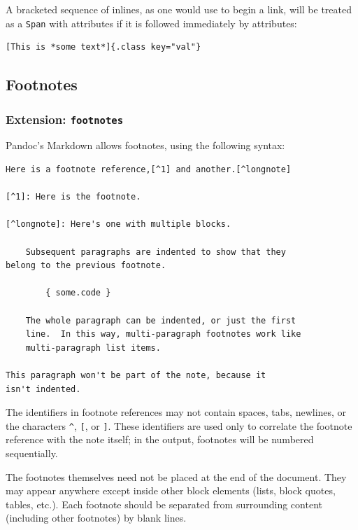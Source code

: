 \documentclass[
]{article}
\begin{document}
A bracketed sequence of inlines, as one would use to begin a link, will
be treated as a \texttt{Span} with attributes if it is followed
immediately by attributes:

\begin{verbatim}
[This is *some text*]{.class key="val"}
\end{verbatim}

\hypertarget{footnotes}{%
\subsection{Footnotes}\label{footnotes}}

\hypertarget{extension-footnotes}{%
\subsubsection{\texorpdfstring{Extension:
\texttt{footnotes}}{Extension: footnotes}}\label{extension-footnotes}}

Pandoc's Markdown allows footnotes, using the following syntax:

\begin{verbatim}
Here is a footnote reference,[^1] and another.[^longnote]

[^1]: Here is the footnote.

[^longnote]: Here's one with multiple blocks.

    Subsequent paragraphs are indented to show that they
belong to the previous footnote.

        { some.code }

    The whole paragraph can be indented, or just the first
    line.  In this way, multi-paragraph footnotes work like
    multi-paragraph list items.

This paragraph won't be part of the note, because it
isn't indented.
\end{verbatim}

The identifiers in footnote references may not contain spaces, tabs,
newlines, or the characters \texttt{\^{}}, \texttt{{[}}, or
\texttt{{]}}. These identifiers are used only to correlate the footnote
reference with the note itself; in the output, footnotes will be
numbered sequentially.

The footnotes themselves need not be placed at the end of the document.
They may appear anywhere except inside other block elements (lists,
block quotes, tables, etc.). Each footnote should be separated from
surrounding content (including other footnotes) by blank lines.
\end{document}
